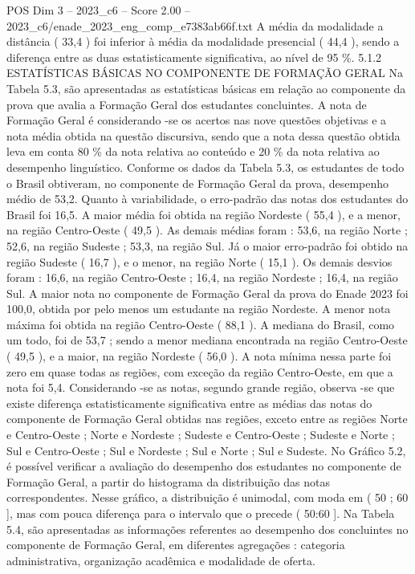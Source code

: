 \begin{textsample}{POS Dim 3 – 2023\_c6 – Score 2.00 – 2023\_c6/enade\_2023\_eng\_comp\_e7383ab66f.txt}
A média da modalidade a distância ( 33,4 ) foi inferior à média da modalidade presencial ( 44,4 ), sendo a diferença entre as duas estatisticamente significativa, ao nível de 95 \%. 5.1.2 ESTATÍSTICAS BÁSICAS NO COMPONENTE DE FORMAÇÃO GERAL Na Tabela 5.3, são apresentadas as estatísticas básicas em relação ao componente da prova que avalia a Formação Geral dos estudantes concluintes.
A nota de Formação Geral é considerando -se os acertos nas nove questões objetivas e a nota média obtida na questão discursiva, sendo que a nota dessa questão obtida leva em conta 80 \% da nota relativa ao conteúdo e 20 \% da nota relativa ao desempenho linguístico.
Conforme os dados da Tabela 5.3, os estudantes de todo o Brasil obtiveram, no componente de Formação Geral da prova, desempenho médio de 53,2.
Quanto à variabilidade, o erro-padrão das notas dos estudantes do Brasil foi 16,5.
A maior média foi obtida na região Nordeste ( 55,4 ), e a menor, na região Centro-Oeste ( 49,5 ).
As demais médias foram : 53,6, na região Norte ; 52,6, na região Sudeste ; 53,3, na região Sul.
Já o maior erro-padrão foi obtido na região Sudeste ( 16,7 ), e o menor, na região Norte ( 15,1 ).
Os demais desvios foram : 16,6, na região Centro-Oeste ; 16,4, na região Nordeste ; 16,4, na região Sul.
A maior nota no componente de Formação Geral da prova do Enade 2023 foi 100,0, obtida por pelo menos um estudante na região Nordeste.
A menor nota máxima foi obtida na região Centro-Oeste ( 88,1 ).
A mediana do Brasil, como um todo, foi de 53,7 ; sendo a menor mediana encontrada na região Centro-Oeste ( 49,5 ), e a maior, na região Nordeste ( 56,0 ).
A nota mínima nessa parte foi zero em quase todas as regiões, com exceção da região Centro-Oeste, em que a nota foi 5,4.
Considerando -se as notas, segundo grande região, observa -se que existe diferença estatisticamente significativa entre as médias das notas do componente de Formação Geral obtidas nas regiões, exceto entre as regiões Norte e Centro-Oeste ; Norte e Nordeste ; Sudeste e Centro-Oeste ; Sudeste e Norte ; Sul e Centro-Oeste ; Sul e Nordeste ; Sul e Norte ; Sul e Sudeste.
No Gráfico 5.2, é possível verificar a avaliação do desempenho dos estudantes no componente de Formação Geral, a partir do histograma da distribuição das notas correspondentes.
Nesse gráfico, a distribuição é unimodal, com moda em ( 50 ; 60 ], mas com pouca diferença para o intervalo que o precede ( 50:60 ].
Na Tabela 5.4, são apresentadas as informações referentes ao desempenho dos concluintes no componente de Formação Geral, em diferentes agregações : categoria administrativa, organização acadêmica e modalidade de oferta.

\end{textsample}
